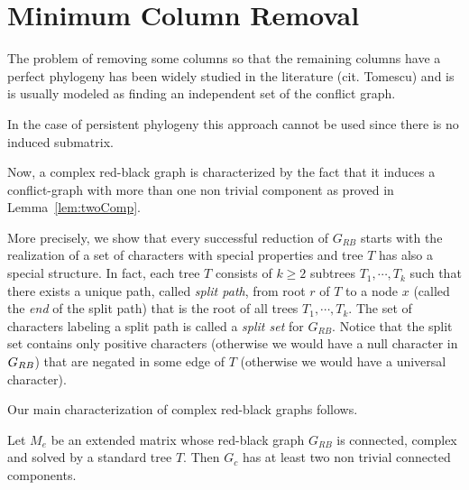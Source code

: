 \section{Minimum Column Removal}

The problem of removing some columns so that the remaining columns have a perfect phylogeny has been widely studied in the literature (cit. Tomescu) and is is usually modeled as finding an independent set of the conflict graph.

In the case of persistent phylogeny this approach cannot be used since there is no induced submatrix.

Now, a complex red-black graph is characterized by the fact that it induces a
conflict-graph with more than one non trivial component as proved in
Lemma~\ref{lem:twoComp}.

More precisely,  we show that every successful
reduction of  $G_{RB}$ starts with the realization of a set of
characters with special properties and tree $T$ has also a special structure.
In fact, each tree $T$ consists of  $k \geq 2$ subtrees $T_1, \cdots, T_k$
such that there exists a unique path, called \emph{split path}, from root $r$
of $T$ to a node $x$ (called the \emph{end} of the split path)
that is  the root of all  trees $T_1, \cdots, T_k$.
The set of characters labeling a split path is called a {\em split set} for
$G_{RB}$.
Notice that the split set contains only positive characters (otherwise we would
have a null
character in $G_{RB}$) that are negated in some edge of $T$ (otherwise we would
have a universal character).

Our main characterization of complex red-black graphs follows.

\begin{lemma}
  \label{lem:twoComp}
Let $M_e$ be an extended matrix whose red-black graph  $G_{RB}$
is connected, complex and solved by a standard tree $T$.
Then $G_{c}$ has  at least two non trivial
connected components.

\end{lemma}



